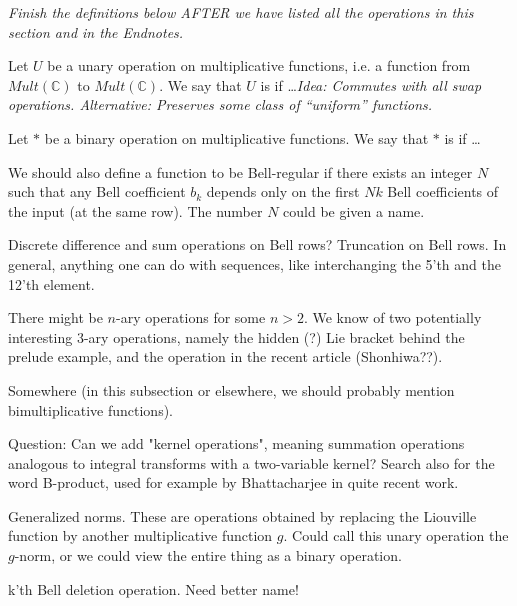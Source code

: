 \documentclass[a4paper]{article}
\begin{document}
\emph{Finish the definitions below AFTER we have listed all the operations in this section and in the Endnotes.}

\begin{definition}
Let $U$ be a unary operation on multiplicative functions, i.e. a function from $Mult(\mathbb{C})$ to $Mult(\mathbb{C})$. We say that $U$ is  if \ldots \emph{Idea: Commutes with all swap operations. Alternative: Preserves some class of ``uniform'' functions.}
\end{definition}

\begin{definition}
Let $*$ be a binary operation on multiplicative functions. We say that $*$ is  if \ldots 
\end{definition}

We should also define a function to be Bell-regular if there exists an integer $N$ such that any Bell coefficient $b_k$ depends only on the first $Nk$ Bell coefficients of the input (at the same row). The number $N$ could be given a name.


Discrete difference and sum operations on Bell rows? Truncation on Bell rows. In general, anything one can do with sequences, like interchanging the 5'th and the 12'th element.

There might be $n$-ary operations for some $n>2$. We know of two potentially interesting 3-ary operations, namely the hidden (?) Lie bracket behind the prelude example, and the operation in the recent article (Shonhiwa??).  


Somewhere (in this subsection or elsewhere, we should probably mention bimultiplicative functions). 

Question: Can we add "kernel operations", meaning summation operations analogous to integral transforms with a two-variable kernel? Search also for the word B-product, used for example by Bhattacharjee in quite recent work.

Generalized norms. These are operations obtained by replacing the Liouville function by another multiplicative function $g$. Could call this unary operation the $g$-norm, or we could view the entire thing as a binary operation.

\begin{propdef}
k'th Bell deletion operation. Need better name!
\end{propdef}
\end{document}
